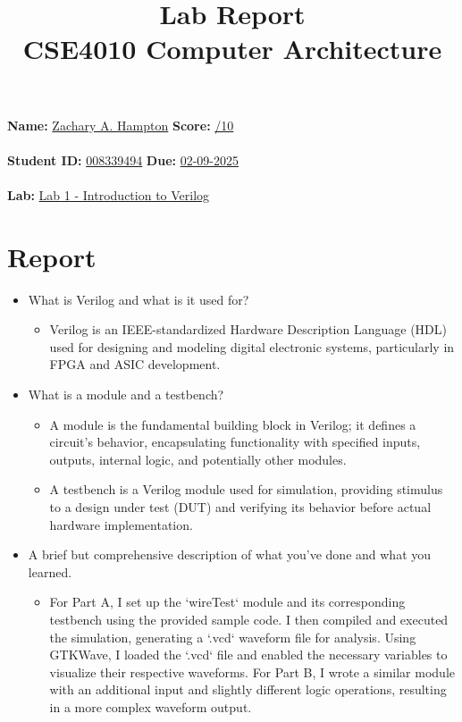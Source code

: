 \documentclass[a4paper,12pt]{article}
\title{Lab Report\\ CSE4010 Computer Architecture}
\author{}
\date{}
\begin{document}
\maketitle

\noindent \textbf{Name:} \underline{Zachary A. Hampton\hspace{5cm}} \hfill \textbf{Score:} \underline{\hspace{2cm}/10} \\\\
\textbf{Student ID:} \underline{008339494\hspace{6cm}} \hfill \textbf{Due:} \underline{02-09-2025} \\\\
\textbf{Lab:} \underline{Lab 1 - Introduction to Verilog\hspace{9cm}}

\section*{Report}
\begin{itemize}
    \item What is Verilog and what is it used for?
        \begin{itemize}
            \item Verilog is an IEEE-standardized Hardware Description Language (HDL) used for designing and modeling digital electronic systems, particularly in FPGA and ASIC development.
        \end{itemize}
    \item What is a module and a testbench?
    \begin{itemize}
            \item A module is the fundamental building block in Verilog; it defines a circuit's behavior, encapsulating functionality with specified inputs, outputs, internal logic, and potentially other modules.
            \item A testbench is a Verilog module used for simulation, providing stimulus to a design under test (DUT) and verifying its behavior before actual hardware implementation.
        \end{itemize}
    \item A brief but comprehensive description of what you’ve done and what you learned.
    \begin{itemize}
            \item For Part A, I set up the `wireTest` module and its corresponding testbench using the provided sample code. I then compiled and executed the simulation, generating a `.vcd` waveform file for analysis. Using GTKWave, I loaded the `.vcd` file and enabled the necessary variables to visualize their respective waveforms. For Part B, I wrote a similar module with an additional input and slightly different logic operations, resulting in a more complex waveform output.
        \end{itemize}
\end{itemize}
\end{document}
